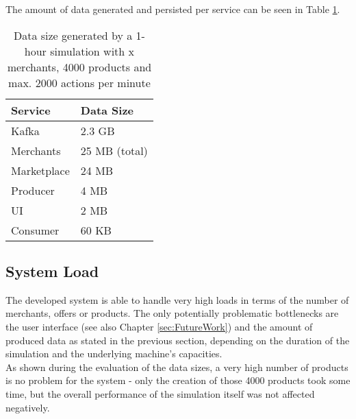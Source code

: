 The amount of data generated and persisted per service can be seen in Table \ref{table:generated_data}.

\begin{table}[h]
\centering
\caption{Data size generated by a 1-hour simulation with x merchants, 4000 products and max. 2000 actions per minute}
\label{table:generated_data}
\begin{tabular}{|l|l|}
\hline
\textbf{Service} & \textbf{Data Size} \\ \hline
Kafka            & 2.3 GB             \\ \hline
Merchants        & 25 MB (total)      \\ \hline
Marketplace      & 24 MB              \\ \hline
Producer         & 4 MB               \\ \hline
UI               & 2 MB               \\ \hline
Consumer         & 60 KB              \\ \hline
\end{tabular}
\end{table}





\subsection{System Load}
\label{sec:system_evaluation}
%
The developed system is able to handle very high loads in terms of the number of merchants, offers or products. The only potentially problematic bottlenecks are the user interface (see also Chapter \ref{sec:FutureWork}) and the amount of produced data as stated in the previous section, depending on the duration of the simulation and the underlying machine's capacities.  \\

As shown during the evaluation of the data sizes, a very high number of products is no problem for the system - only the creation of those 4000 products took some time, but the overall performance of the simulation itself was not affected negatively. 

